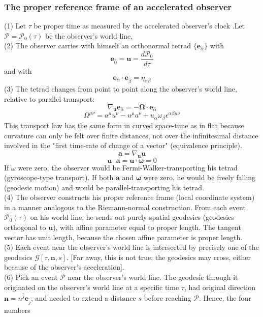 \documentclass{article}
\begin{document}
\subsubsection{The proper reference frame of an accelerated observer}
(1) Let $\tau$ be proper time as measured by the accelerated observer's clock .Let $\mathcal{P} = \mathcal{P}_0(\tau)$ be the observer's world line.\\
(2) The observer carries with himself an orthonormal tetrad $\{\mathbf{e}_{\hat{\alpha}}\}$
with
\[\mathbf{e}_{\hat{0}} = \mathbf{u} = \frac{d \mathcal{P}_0}{d \tau}\]
and with
\[\mathbf{e}_{\hat{\alpha}} \cdot \mathbf{e}_{\hat{\beta}} = \eta_{\alpha \beta}\]
(3) The tetrad changes from point to point along the observer's world line, relative to parallel transport:
\[\nabla_{\mathbf{u}} \mathbf{e}_{\hat{\alpha}} = - \mathbf{\Omega} \cdot \mathbf{e}_{\hat{\alpha}} \]
\[\Omega^{\mu \nu} = a^{\mu} u^{\nu} - u^{\mu} a^{\nu} + u_{\alpha} \omega_{\beta}\epsilon^{\alpha \beta \mu \nu}\]
This transport law has the same form in curved space-time as in flat because curvature can only be felt over finite distances, not over
the infinitesimal distance involved in the "first time-rate of change of a vector" (equivalence principle).
\[\mathbf{a} = \nabla_{\mathbf{u}} \mathbf{u}\]
\[\mathbf{u} \cdot \mathbf{a} = \mathbf{u} \cdot \mathbf{\omega} = 0\]
If $\omega$ were zero, the observer would be Fermi-Walker-transporting his tetrad (gyroscope-type transport). If both $\mathbf{a}$ and $\mathbf{\omega}$ were zero, he would be freely falling (geodesic motion) and would be parallel-transporting his tetrad.\\
(4) The observer constructs his proper reference frame (local coordinate system) in a manner analogous to the Riemann-normal construction. From each event $\mathcal{P}_0(\tau)$ on his world line, he sends out purely spatial geodesics (geodesics orthogonal to $\mathbf{u}$), with affine parameter equal to proper length. The tangent vector has unit length, because the chosen affine
parameter is proper length.\\
(5) Each event near the observer's world line is intersected by precisely one of the geodesics $\mathcal{G}[\tau,\mathbf{n},s]$. [Far away, this is not true; the geodesics may cross, either
because of the observer's acceleration].\\
(6) Pick an event $\mathcal{P}$ near the observer's world line. The geodesic through it originated on the observer's world line at a specific time $\tau$, had original direction $\mathbf{n} = n^{\hat{j}} \mathbf{e}_{\hat{j}}$; and needed to extend a distance $s$ before reaching $\mathcal{P}$. Hence, the four numbers
\end{document}
